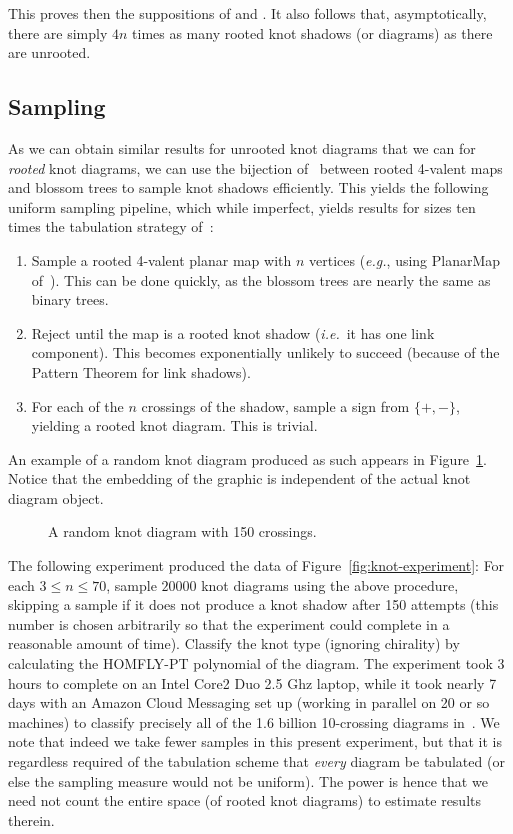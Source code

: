 \documentclass[submission%
]{dmtcs}
\begin{document}
This proves then the suppositions of
\cite{pzjschaeff2004planecurveasymp} and \cite{zuber2015mapsimsperms}.
It also follows that, asymptotically, there are simply $4n$ times as
many rooted knot shadows (or diagrams) as there are unrooted.

\subsection{Sampling}
\label{sec:sampling}

As we can obtain similar results for unrooted knot diagrams that we
can for \emph{rooted} knot diagrams, we can use the bijection
of~\cite{Schaeffer1997} between rooted 4-valent maps and blossom trees
to sample knot shadows efficiently. This yields the following uniform
sampling pipeline, which while imperfect, yields results for sizes ten
times the tabulation strategy of~\cite{CCMknotdiagrams2015}:

\begin{enumerate}
\item Sample a rooted 4-valent planar map with $n$ vertices
  (\textit{e.g.}, using PlanarMap of~\cite{SchaefferPlanarMap}). This can be
  done quickly, as the blossom trees are nearly the same as binary
  trees.
\item Reject until the map is a rooted knot shadow (\textit{i.e.}\ it
  has one link component). This becomes exponentially unlikely to
  succeed (because of the Pattern Theorem for link shadows).
\item For each of the $n$ crossings of the shadow, sample a sign from
  $\{+, -\}$, yielding a rooted knot diagram. This is trivial.
\end{enumerate}

An example of a random knot diagram produced as such appears in
Figure~\ref{fig:randomknot}. Notice that the embedding of the graphic
is independent of the actual knot diagram object.
\begin{figure}[htbp]
  \centering
  
  \caption{A random knot diagram with 150 crossings.}
  \label{fig:randomknot}
\end{figure}

The following experiment produced the data of
Figure~\ref{fig:knot-experiment}: For each $3 \le n \le 70$, sample
$20000$ knot diagrams using the above procedure, skipping a sample if
it does not produce a knot shadow after 150 attempts (this number is
chosen arbitrarily so that the experiment could complete in a
reasonable amount of time). Classify the knot type (ignoring
chirality) by calculating the HOMFLY-PT polynomial of the diagram. The
experiment took 3 hours to complete on an Intel Core2 Duo 2.5 Ghz
laptop, while it took nearly 7 days with an Amazon Cloud Messaging set
up (working in parallel on 20 or so machines) to classify precisely
all of the 1.6 billion 10-crossing diagrams
in~\cite{CCMknotdiagrams2015}. We note that indeed we take fewer
samples in this present experiment, but that it is regardless required
of the tabulation scheme that \emph{every} diagram be tabulated (or
else the sampling measure would not be uniform). The power is hence
that we need not count the entire space (of rooted knot diagrams) to
estimate results therein.
\end{document}
